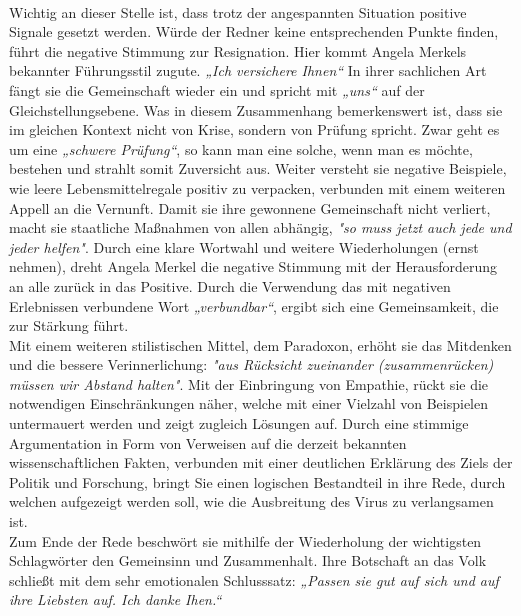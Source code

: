 \\Wichtig an dieser Stelle ist, dass trotz der angespannten Situation positive Signale gesetzt werden. Würde der Redner keine entsprechenden Punkte finden, führt die negative Stimmung zur Resignation. Hier kommt Angela Merkels bekannter Führungsstil zugute. \textit{„Ich versichere Ihnen“} In ihrer sachlichen Art fängt sie die Gemeinschaft wieder ein und spricht mit \textit{„uns“} auf der Gleichstellungsebene. Was in diesem Zusammenhang bemerkenswert ist, dass sie im gleichen Kontext nicht von Krise, sondern von Prüfung spricht. Zwar geht es um eine \textit{„schwere Prüfung“}, so kann man eine solche, wenn man es möchte, bestehen und strahlt somit Zuversicht aus. Weiter versteht sie negative Beispiele, wie leere Lebensmittelregale positiv zu verpacken, verbunden mit einem weiteren Appell an die Vernunft. Damit sie ihre gewonnene Gemeinschaft nicht verliert, macht sie staatliche Maßnahmen von allen abhängig, \textit{"so muss jetzt auch jede und jeder helfen"}. Durch eine klare Wortwahl und weitere Wiederholungen (ernst nehmen), dreht Angela Merkel die negative Stimmung mit der Herausforderung an alle zurück in das Positive. Durch die Verwendung das mit negativen Erlebnissen verbundene Wort \textit{„verbundbar“}, ergibt sich eine Gemeinsamkeit, die zur Stärkung führt. 
\\Mit einem weiteren stilistischen Mittel, dem Paradoxon, erhöht sie das Mitdenken und die bessere Verinnerlichung: \textit{"aus Rücksicht zueinander (zusammenrücken) müssen wir Abstand halten"}. Mit der Einbringung von Empathie, rückt sie die notwendigen Einschränkungen näher, welche mit einer Vielzahl von Beispielen untermauert werden und zeigt zugleich Lösungen auf. Durch eine stimmige Argumentation in Form von Verweisen auf die derzeit bekannten wissenschaftlichen Fakten, verbunden mit einer deutlichen Erklärung des Ziels der Politik und Forschung, bringt Sie einen logischen Bestandteil in ihre Rede, durch welchen aufgezeigt werden soll, wie die Ausbreitung des Virus zu verlangsamen ist.
\\Zum Ende der Rede beschwört sie mithilfe der Wiederholung der wichtigsten Schlagwörter den Gemeinsinn und Zusammenhalt. Ihre Botschaft an das Volk schließt mit dem sehr emotionalen Schlusssatz: \textit{„Passen sie gut auf sich und auf ihre Liebsten auf. Ich danke Ihen.“}